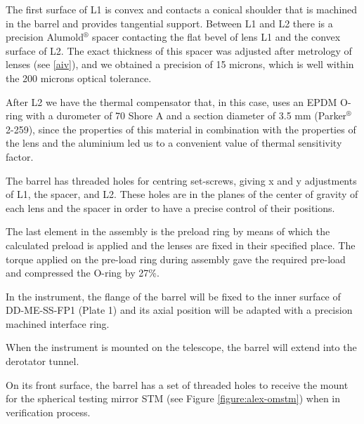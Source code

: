 \documentclass{report}
\begin{document}
The first surface of L1 is convex and contacts a conical shoulder that is machined in the barrel and provides tangential support. Between L1 and L2 there is a precision Alumold${}^\circledR $ spacer contacting the flat bevel of lens L1 and the convex surface of L2. The exact thickness of this spacer was adjusted after metrology of lenses (see \ref{aiv}), and we obtained a precision of 15 microns, which is well within the 200 microns optical tolerance.

After L2 we have the thermal compensator that, in this case, uses an EPDM O-ring with a durometer of 70 Shore A and a section diameter of 3.5 mm (Parker${}^\circledR $ 2-259), since the properties of this material in combination with the properties of the lens and the aluminium led us to a convenient value of thermal sensitivity factor. 

The barrel has threaded holes for centring set-screws, giving x and y adjustments of L1, the spacer, and L2. These holes are in the planes of the center of gravity of each lens and the spacer in order to have a precise control of their positions.

The last element in the assembly is the preload ring by means of which the calculated preload is applied and the lenses are fixed in their specified place. The torque applied on the pre-load ring during assembly gave the required pre-load and compressed the O-ring by 27\%.

In the instrument, the flange of the barrel will be fixed to the inner surface of DD-ME-SS-FP1 (Plate 1) and its axial position will be adapted with a precision machined interface ring. 

When the instrument is mounted on the telescope, the barrel will extend into the derotator tunnel.

On its front surface, the barrel has a set of threaded holes to receive the mount for the spherical testing mirror STM (see Figure \ref{figure:alex-omstm}) when in verification process.
\end{document}
